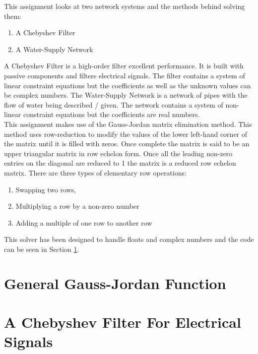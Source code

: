 \documentclass[11pt,a4paper]{article}
\begin{document}
This assignment looks at two network systems and the methods behind solving them:

\begin{enumerate}
  \item A Chebyshev Filter
  \item A Water-Supply Network
\end{enumerate}

A Chebyshev Filter is a high-order filter excellent performance. It is built with passive components and filters electrical signals. The filter contains a system of linear constraint equations but the coefficients as well as the unknown values can be complex numbers. The Water-Supply Network is a network of pipes with the flow of water being described / given. The network contains a system of non-linear constraint equations but the coefficients are real numbers.\\

\bigskip
This assignment makes use of the Gauss-Jordan matrix elimination method. This method uses row-reduction to  modify the values of the lower left-hand corner of the matrix until it is filled with zeros. Once complete the matrix is said to be an upper triangular matrix in row echelon form. Once all the leading non-zero entries on the diagonal are reduced to 1 the matrix is a reduced row echelon matrix. There are three types of elementary row operations:
\begin{enumerate}
  \item Swapping two rows,
  \item Multiplying a row by a non-zero number
  \item Adding a multiple of one row to another row
\end{enumerate}
This solver has been designed to handle floats and complex numbers and the code can be seen in Section \ref{sec:GaussJordanCode}. 

\newpage

\section{General Gauss-Jordan Function} \label{sec:GaussJordanCode}

\newpage

\section{A Chebyshev Filter For Electrical Signals} \label{sec:Cheb}
\end{document}
